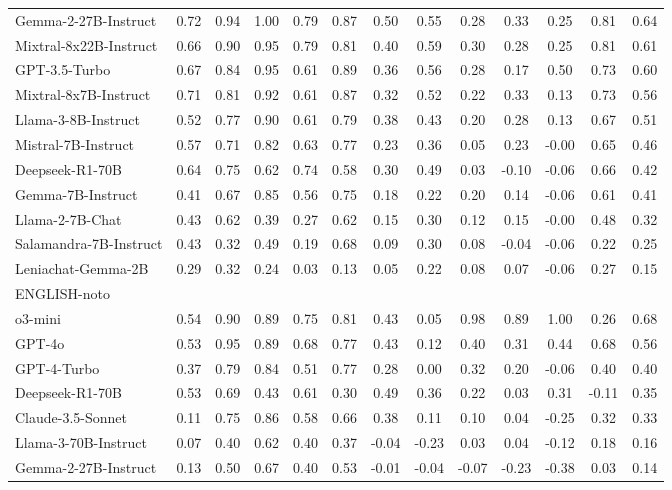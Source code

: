 \begin{table*}[ht]
{\begin{tabular}{lcccccccccccc}
Gemma-2-27B-Instruct & 0.72 & 0.94 & 1.00 & 0.79 & 0.87 & 0.50 & 0.55 & 0.28 & 0.33 & 0.25 & 0.81 & 0.64 \\
Mixtral-8x22B-Instruct & 0.66 & 0.90 & 0.95 & 0.79 & 0.81 & 0.40 & 0.59 & 0.30 & 0.28 & 0.25 & 0.81 & 0.61 \\
GPT-3.5-Turbo & 0.67 & 0.84 & 0.95 & 0.61 & 0.89 & 0.36 & 0.56 & 0.28 & 0.17 & 0.50 & 0.73 & 0.60 \\
Mixtral-8x7B-Instruct & 0.71 & 0.81 & 0.92 & 0.61 & 0.87 & 0.32 & 0.52 & 0.22 & 0.33 & 0.13 & 0.73 & 0.56 \\
Llama-3-8B-Instruct & 0.52 & 0.77 & 0.90 & 0.61 & 0.79 & 0.38 & 0.43 & 0.20 & 0.28 & 0.13 & 0.67 & 0.51 \\
Mistral-7B-Instruct & 0.57 & 0.71 & 0.82 & 0.63 & 0.77 & 0.23 & 0.36 & 0.05 & 0.23 & -0.00 & 0.65 & 0.46 \\
Deepseek-R1-70B & 0.64 & 0.75 & 0.62 & 0.74 & 0.58 & 0.30 & 0.49 & 0.03 & -0.10 & -0.06 & 0.66 & 0.42 \\
Gemma-7B-Instruct & 0.41 & 0.67 & 0.85 & 0.56 & 0.75 & 0.18 & 0.22 & 0.20 & 0.14 & -0.06 & 0.61 & 0.41 \\
Llama-2-7B-Chat & 0.43 & 0.62 & 0.39 & 0.27 & 0.62 & 0.15 & 0.30 & 0.12 & 0.15 & -0.00 & 0.48 & 0.32 \\
Salamandra-7B-Instruct & 0.43 & 0.32 & 0.49 & 0.19 & 0.68 & 0.09 & 0.30 & 0.08 & -0.04 & -0.06 & 0.22 & 0.25 \\
Leniachat-Gemma-2B & 0.29 & 0.32 & 0.24 & 0.03 & 0.13 & 0.05 & 0.22 & 0.08 & 0.07 & -0.06 & 0.27 & 0.15 \\
\midrule
ENGLISH-noto &&&&&&&&&&&&\\
\midrule
o3-mini & 0.54 & 0.90 & 0.89 & 0.75 & 0.81 & 0.43 & 0.05 & 0.98 & 0.89 & 1.00 & 0.26 & 0.68 \\
GPT-4o & 0.53 & 0.95 & 0.89 & 0.68 & 0.77 & 0.43 & 0.12 & 0.40 & 0.31 & 0.44 & 0.68 & 0.56 \\
GPT-4-Turbo & 0.37 & 0.79 & 0.84 & 0.51 & 0.77 & 0.28 & 0.00 & 0.32 & 0.20 & -0.06 & 0.40 & 0.40 \\
Deepseek-R1-70B & 0.53 & 0.69 & 0.43 & 0.61 & 0.30 & 0.49 & 0.36 & 0.22 & 0.03 & 0.31 & -0.11 & 0.35 \\
Claude-3.5-Sonnet & 0.11 & 0.75 & 0.86 & 0.58 & 0.66 & 0.38 & 0.11 & 0.10 & 0.04 & -0.25 & 0.32 & 0.33 \\
Llama-3-70B-Instruct & 0.07 & 0.40 & 0.62 & 0.40 & 0.37 & -0.04 & -0.23 & 0.03 & 0.04 & -0.12 & 0.18 & 0.16 \\
Gemma-2-27B-Instruct & 0.13 & 0.50 & 0.67 & 0.40 & 0.53 & -0.01 & -0.04 & -0.07 & -0.23 & -0.38 & 0.03 & 0.14 \\

\end{tabular}}
\end{table*}
